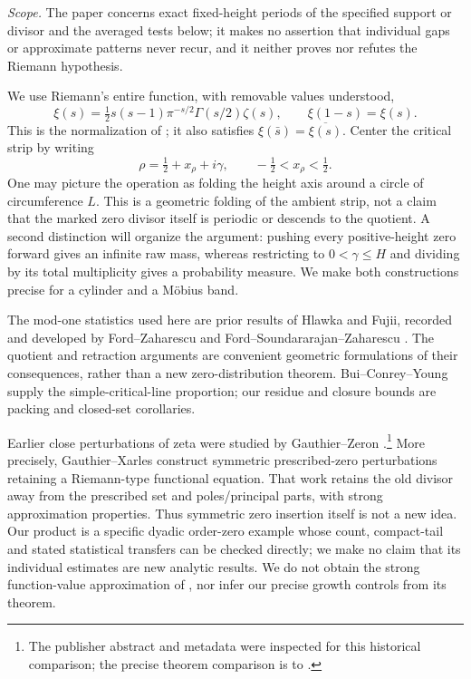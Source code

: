 \documentclass[11pt,a4paper]{article}
\theoremstyle{definition}
\theoremstyle{remark}
\begin{document}
\emph{Scope.} The paper concerns exact fixed-height periods of the specified
support or divisor and the averaged tests below; it makes no assertion that
individual gaps or approximate patterns never recur, and it neither proves
nor refutes the Riemann hypothesis.

We use Riemann's entire function, with removable values understood,
\[
 \xi(s)=\tfrac12s(s-1)\pi^{-s/2}\Gamma(s/2)\zeta(s),
 \qquad \xi(1-s)=\xi(s).
\]
This is the normalization of \cite[25.4.3--25.4.4]{DLMF}; it also satisfies
$\xi(\bar s)=\overline{\xi(s)}$.
Center the critical strip by writing
\[
 \rho=\tfrac12+x_\rho+i\gamma,\qquad -\tfrac12<x_\rho<\tfrac12.
\]
One may picture the operation as folding the height axis around a circle of
circumference $L$. This is a geometric folding of the ambient strip, not a
claim that the marked zero divisor itself is periodic or descends to the
quotient. A second distinction will organize the argument: pushing every
positive-height zero forward gives an infinite raw mass, whereas restricting to
$0<\gamma\le H$ and dividing by its total multiplicity gives a probability
measure. We make both constructions precise for a cylinder and a M\"obius
band.

The mod-one statistics used here are prior results of Hlawka and Fujii,
recorded and developed by Ford--Zaharescu and
Ford--Soundararajan--Zaharescu \cite{FZ,FSZ}. The quotient and retraction
arguments are convenient geometric formulations of their consequences,
rather than a new zero-distribution theorem. Bui--Conrey--Young \cite{BCY}
supply the simple-critical-line proportion; our residue and closure bounds
are packing and closed-set corollaries.

Earlier close perturbations of zeta were studied by Gauthier--Zeron
\cite{GZ}.\footnote{The publisher abstract and metadata were inspected for
this historical comparison; the precise theorem comparison is to \cite{GX}.}
More precisely, Gauthier--Xarles \cite[Proposition 1 and Theorem 2]{GX}
construct symmetric prescribed-zero perturbations retaining a Riemann-type
functional equation. That work retains the
old divisor away from the prescribed set and poles/principal parts, with
strong approximation properties. Thus symmetric zero insertion itself is
not a new idea. Our product is a specific dyadic order-zero example whose
count, compact-tail and stated statistical transfers can be checked
directly; we make no claim that its individual estimates are new analytic
results. We do not obtain the strong function-value approximation of
\cite{GX}, nor infer our precise growth controls from its theorem.
\end{document}
